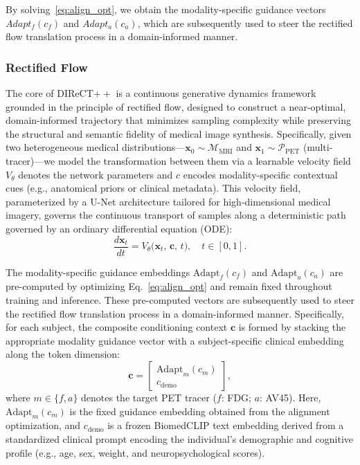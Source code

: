 \documentclass{article}
\begin{document}
By solving~\eqref{eq:align_opt}, we obtain the modality-specific guidance vectors $Adapt_f(c_f)$ and $Adapt_a(c_a)$, which are subsequently used to steer the rectified flow translation process in a domain-informed manner.


\subsubsection{Rectified Flow}
The core of DIReCT$++$ is a continuous generative dynamics framework grounded in the principle of rectified flow, designed to construct a near-optimal, domain-informed trajectory that minimizes sampling complexity while preserving the structural and semantic fidelity of medical image synthesis. Specifically, given two heterogeneous medical distributions---$\mathbf{x}_0 \sim \mathcal{M}_{\text{MRI}}$ and $\mathbf{x}_1 \sim \mathcal{P}_{\text{PET}}$ (multi-tracer)---we model the transformation between them via a learnable velocity field $V_\theta$ denotes the network parameters and $c$ encodes modality-specific contextual cues (e.g., anatomical priors or clinical metadata). This velocity field, parameterized by a U-Net architecture tailored for high-dimensional medical imagery, governs the continuous transport of samples along a deterministic path governed by an ordinary differential equation (ODE):
\begin{equation}
\frac{d\mathbf{x}_t}{dt} = V_\theta\big(\mathbf{x}_t,\, \mathbf{c},\, t\big), \quad t \in [0, 1].
\label{eq:rf_ode}
\end{equation}

The modality-specific guidance embeddings $\text{Adapt}_f(c_f)$ and $\text{Adapt}_a(c_a)$ are pre-computed by optimizing Eq.~\eqref{eq:align_opt} and remain fixed throughout training and inference. These pre-computed vectors are subsequently used to steer the rectified flow translation process in a domain-informed manner. Specifically, for each subject, the composite conditioning context $\mathbf{c} $ is formed by stacking the appropriate modality guidance vector with a subject-specific clinical embedding along the token dimension:
\begin{equation}
\mathbf{c} = 
\begin{bmatrix}
\text{Adapt}_m(c_m) \\
c_{\text{demo}}
\end{bmatrix}
,
\label{eq:composite_conditioning}
\end{equation}
where $m \in \{f, a\}$ denotes the target PET tracer ($f$: FDG; $a$: AV45). Here, $\text{Adapt}_m(c_m)$ is the fixed guidance embedding obtained from the alignment optimization, and $c_{\text{demo}} $ is a frozen BiomedCLIP text embedding derived from a standardized clinical prompt encoding the individual’s demographic and cognitive profile (e.g., age, sex, weight, and neuropsychological scores).
\end{document}

